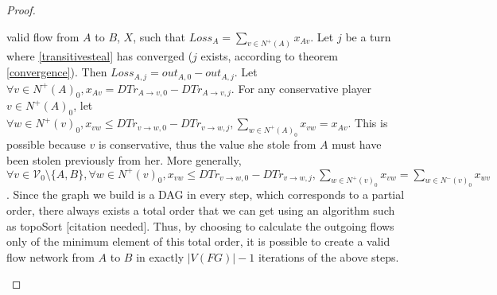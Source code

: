 \documentclass[11pt]{article}
\theoremstyle{definition}
\theoremstyle{corollary}
\theoremstyle{lemma}
\begin{document}
\begin{proof}
\begin{itemize}
          valid flow from $A$ to $B$, $X$, such that $Loss_A = \sum\limits_{v \in N^{+}(A)}x_{Av}$. Let $j$ be a turn where
          \ref{transitivesteal} has converged ($j$ exists, according to theorem \ref{convergence}). Then $Loss_{A, j} =
          out_{A, 0} - out_{A, j}$. Let $\forall v \in N^{+}(A)_0, x_{Av} = DTr_{A \rightarrow v, 0} - DTr_{A \rightarrow
          v, j}$. For any conservative player $v \in N^{+}(A)_0$, let $\forall w \in N^{+}(v)_0, x_{vw} \leq DTr_{v
          \rightarrow w, 0} - DTr_{v \rightarrow w, j}, \sum\limits_{w \in N^{+}(A)_0}x_{vw} = x_{Av}$. This is possible
          because $v$ is conservative, thus the value she stole from $A$ must have been stolen previously from her. More
          generally, $\forall v \in \mathcal{V}_0 \setminus \{A,B\}, \forall w \in N^{+}(v)_0, x_{vw} \leq
          DTr_{v \rightarrow w, 0} - DTr_{v \rightarrow w, j}, \sum\limits_{w \in N^{+}(v)_0}x_{vw} = \sum\limits_{w \in
          N^{-}(v)_0}x_{wv}$. Since the graph we build is a DAG in every step, which corresponds to a partial order, there
          always exists a total order that we can get using an algorithm such as topoSort [citation needed]. Thus, by
          choosing to calculate the outgoing flows only of the minimum element of this total order, it is possible to create
          a valid flow network from $A$ to $B$ in exactly $|V(FG)| - 1$ iterations of the above steps.
       \end{itemize}
    \end{proof}
\end{document}
